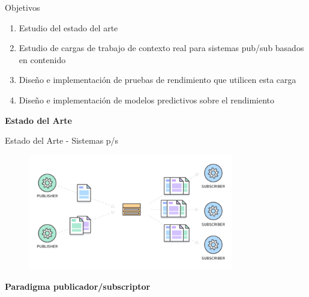 \documentclass[12pt, spanish]{beamer}
\begin{document}

\begin{frame}{Objetivos}
    \begin{enumerate}
        \item Estudio del estado del arte\vspace{0.2cm}
        \item Estudio de cargas de trabajo de contexto real para sistemas pub/sub basados en contenido\vspace{0.2cm}
        \item Diseño e implementación de pruebas de rendimiento que utilicen esta carga\vspace{0.2cm}
        \item Diseño e implementación de modelos predictivos sobre el rendimiento\vspace{0.2cm}
    \end{enumerate}
\end{frame}


\begin{frame}%
    \begin{center}
        {\Large\textbf{Estado del Arte}}
    \end{center}
\end{frame}

\begin{frame}{Estado del Arte - Sistemas p/s} %
    \centering

    \begin{figure}
        \includegraphics[width=0.8\textwidth]{images/pubsub-diagram.png}
    \end{figure}
    \textbf{Paradigma publicador/subscriptor}
    
\end{frame}
\end{document}
